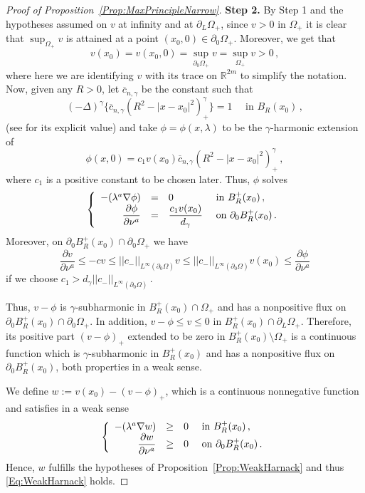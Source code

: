 \documentclass[12pt,reqno]{amsart}
\theoremstyle{definition}
\theoremstyle{remark}
\newcommand{\con}[1]{\mathbb{#1}}
\newcommand{\R}{\con{R}} %
\newcommand{\norm}[1]{\left | \left |{#1} \right | \right |}
\newcommand{\s}{\gamma}
\newcommand{\fraclaplacian}{(-\Delta)^\s}
\newcommand\beqc[1]{\left\{\begin{array}{#1}}
\newcommand\eeqc{\end{array} \right.}
\def\PDEsystem{rcll}
\let\div\relax
\DeclareMathOperator{\div}{div}
\numberwithin{equation}{section}
\begin{document}
\begin{proof}[Proof of Proposition~\ref{Prop:MaxPrincipleNarrow}]
\textbf{Step 2.}
By Step 1 and the hypotheses assumed on $v$ at infinity and at $\partial_L \Omega_+$, since $v>0$ in $\Omega_+$ it is clear that $\sup_{\Omega_+} v$ is attained at a point $(x_0,0)\in \partial_0 \Omega_+$. Moreover, we get that  
\begin{equation}
\label{Eq:PositiveSuprem}
v(x_0)= v(x_0,0) = \sup_{\partial_0 \Omega_+} v = \sup_{\Omega_+} v  > 0\,,
\end{equation}
where here we are identifying $v$ with its trace on $\R^{2m}$ to simplify the notation. Now, given any $R>0$, let $\overline{c}_{n,\s}$ be the constant such that
$$
\fraclaplacian \{ \overline{c}_{n,\s} (R^2 - |x-x_0|^2)^\s_+ \} = 1 \quad \text{ in } B_R (x_0)\,,
$$
(see \cite{BogdanEtAl} for its explicit value) and take $\phi = \phi(x,\lambda)$ to be the $\s$-harmonic extension of 
$$
\phi(x,0) = c_1 v(x_0)  \overline{c}_{n,\s}  (R^2 - |x-x_0|^2)^\s_+\,,
$$
where $c_1$ is a positive constant to be chosen later. Thus, $\phi$ solves
$$
\beqc{\PDEsystem}
-\div(\lambda^a \nabla \phi) &=& 0 & \text{ in } B^+_R(x_0)\,, \\
\dfrac{\partial \phi}{\partial \nu^a} & = & \dfrac{c_1 v(x_0)}{d_\s} & \text{ on } \partial_0 B^+_R(x_0)\,.
\eeqc
$$
Moreover, on $\partial_0 B^+_R(x_0) \cap \partial_0\Omega_+$ we have
$$
\dfrac{\partial v}{\partial \nu^a} \leq - c v  \leq \norm{c_-}_{L^\infty (\partial_0\Omega)} v \leq  \norm{c_-}_{L^\infty (\partial_0\Omega)} v(x_0) \leq \dfrac{\partial \phi}{\partial \nu^a}
$$
if we choose $c_1 > d_\s\norm{c_-}_{L^\infty (\partial_0\Omega)}$\,.

Thus, $v-\phi$ is $\s$-subharmonic in $B^+_R(x_0) \cap \Omega_+$ and has a nonpositive flux on $\partial_0 B^+_R(x_0) \cap \partial_0\Omega_+$. In addition, $v-\phi \leq v \leq 0$ in $B_R^+(x_0)\cap \partial_L \Omega_+$. Therefore, its positive part $(v-\phi)_+$ extended to be zero in $B_R^+(x_0)\setminus \Omega_+ $ is a continuous function which is $\s$-subharmonic in $B^+_R(x_0)$ and has a nonpositive flux on $\partial_0 B^+_R(x_0)$, both properties in a weak sense.

We define $w := v(x_0)-(v-\phi)_+$, which is a continuous nonnegative function and satisfies in a weak sense
$$
\beqc{\PDEsystem}
-\div(\lambda^a \nabla w) &\geq & 0 & \text{ in } B^+_R(x_0) \,, \\
\dfrac{\partial w}{\partial \nu^a} & \geq & 0 & \text{ on } \partial_0 B^+_R(x_0)  \,.
\eeqc
$$
Hence, $w$ fulfills the hypotheses of Proposition~\ref{Prop:WeakHarnack} and thus \eqref{Eq:WeakHarnack} holds.


\end{proof}
\end{document}
